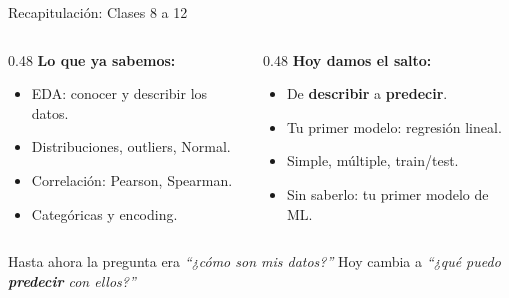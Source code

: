 \documentclass[aspectratio=169, 11pt]{beamer}
\begin{document}
\begin{frame}[shrink=5]{Recapitulación: Clases 8 a 12}
  \vspace{-4pt}
  \begin{columns}[T]
    \begin{column}{0.48\textwidth}
      {\footnotesize\bfseries\color{arcaDark} Lo que ya sabemos:}
      \vspace{4pt}

      {\footnotesize
      \begin{itemize}\setlength{\itemsep}{4pt}
        \item[{\color{codeGreen}\faCheckCircle}]
          EDA: conocer y describir los datos.
        \item[{\color{codeGreen}\faCheckCircle}]
          Distribuciones, outliers, Normal.
        \item[{\color{codeGreen}\faCheckCircle}]
          Correlación: Pearson, Spearman.
        \item[{\color{codeGreen}\faCheckCircle}]
          Categóricas y encoding.
      \end{itemize}
      }
    \end{column}

    \begin{column}{0.48\textwidth}
      {\footnotesize\bfseries\color{arcaRed} Hoy damos el salto:}
      \vspace{4pt}

      {\footnotesize
      \begin{itemize}\setlength{\itemsep}{4pt}
        \item[{\color{arcaRed}\faArrowRight}]
          De \textbf{describir} a \textbf{predecir}.
        \item[{\color{arcaRed}\faArrowRight}]
          Tu primer modelo: regresión lineal.
        \item[{\color{arcaRed}\faArrowRight}]
          Simple, múltiple, train/test.
        \item[{\color{arcaRed}\faArrowRight}]
          Sin saberlo: tu primer modelo de ML.
      \end{itemize}
      }
    \end{column}
  \end{columns}

  \vspace{8pt}
  {\footnotesize\color{arcaDark}
    \faLightbulb\hspace{4pt}
    Hasta ahora la pregunta era \textit{``¿cómo son mis datos?''}
    Hoy cambia a \textit{``¿qué puedo \textbf{predecir} con ellos?''}}
\end{frame}
\end{document}

